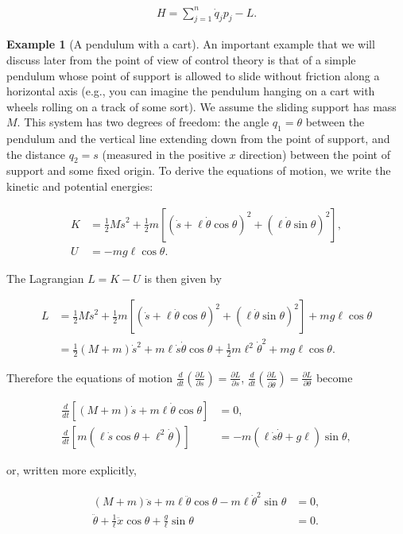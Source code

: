 \documentclass[11pt]{report}
\theoremstyle{plain}
\theoremstyle{definition}
\newtheorem{example}[thm]{Example}
\begin{document}
\begin{align*}
H = \sum_{j=1}^n \dot{q}_j p_j - L.
\end{align*}

\begin{example}[A pendulum with a cart]
An important example that we will discuss later from
the point of view of control theory is that of a
simple pendulum whose point of support is allowed to
slide without friction along a horizontal axis (e.g.,
you can imagine the pendulum hanging on a cart with
wheels rolling on a track of some sort). We assume the
sliding support has mass $M$. This system has two
degrees of freedom: the angle $q_1 = \theta$ between
the pendulum and the vertical line extending down from
the point of support, and the distance $q_2 = s$
(measured in the positive $x$ direction) between the
point of support and some fixed origin. To derive the
equations of motion, we write the kinetic and
potential energies:

\begin{align*}
K &= \tfrac12 M \dot{s}^2 + \tfrac12 m \left[ \left(\dot{s}+\ell \dot{\theta} \cos \theta \right)^2 + \left(\ell \dot{\theta} \sin \theta \right)^2 \right], \\
U &= -mg \ell \cos \theta.
\end{align*}

\noindent The Lagrangian $L=K-U$ is then given by

\begin{align*}
L &=
\tfrac12 M \dot{s}^2 + \tfrac12 m \left[ \left(\dot{s}+\ell \dot{\theta} \cos \theta \right)^2 + \left(\ell \dot{\theta} \sin \theta \right)^2 \right] + mg \ell \cos \theta \\
&= \tfrac12(M+m)\dot{s}^2 + m\ell \dot{s} \dot{\theta} \cos \theta + \tfrac12 m \ell^2 \dot{\theta}^2 + mg\ell \cos\theta.
\end{align*}

\noindent Therefore the equations of motion
$\frac{d}{dt}\left(\frac{\partial L}{\partial
\dot{s}}\right)=\frac{\partial L}{\partial s}$,
$\frac{d}{dt}\left(\frac{\partial L}{\partial
\dot{\theta}}\right)=\frac{\partial L}{\partial
\theta}$
become

\begin{align*}
\frac{d}{dt}\left[ (M+m)\dot{s} + m\ell\dot{\theta}\cos \theta \right] &= 0, \\
\frac{d}{dt}\left[m(\ell \dot{s}  \cos\theta + \ell^2 \dot{\theta})\right] &= -m(\ell\dot{s} \dot{\theta} + g\ell)\sin \theta,
\end{align*}

\noindent or, written more explicitly,

\begin{align*}
(M+m)\ddot{s} + m\ell \ddot{\theta} \cos \theta -m\ell \dot{\theta}^2 \sin\theta &= 0, \\
\ddot{\theta} + \frac{1}{\ell}\ddot{x} \cos\theta + \frac{g}{\ell}  \sin\theta &= 0.
\end{align*}

\end{example}
\end{document}
